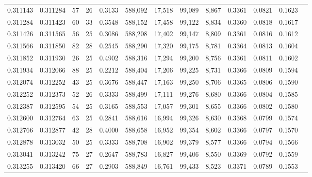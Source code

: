 \begin{tabular}{rrrrrrrrrrrrr}
0.311143 & 0.311284 &  57 &  26 &                                     0.3133 & 588,092 &  17,518 &  99,089 &   8,867 & 0.3361 & 0.0821 & 0.1623 \\
0.311284 & 0.311423 &  60 &  33 &                                     0.3548 & 588,152 &  17,458 &  99,122 &   8,834 & 0.3360 & 0.0818 & 0.1617 \\
0.311426 & 0.311565 &  56 &  25 &                                     0.3086 & 588,208 &  17,402 &  99,147 &   8,809 & 0.3361 & 0.0816 & 0.1612 \\
0.311566 & 0.311850 &  82 &  28 &                                     0.2545 & 588,290 &  17,320 &  99,175 &   8,781 & 0.3364 & 0.0813 & 0.1604 \\
0.311852 & 0.311930 &  26 &  25 &                                     0.4902 & 588,316 &  17,294 &  99,200 &   8,756 & 0.3361 & 0.0811 & 0.1602 \\
0.311934 & 0.312066 &  88 &  25 &                                     0.2212 & 588,404 &  17,206 &  99,225 &   8,731 & 0.3366 & 0.0809 & 0.1594 \\
0.312074 & 0.312252 &  43 &  25 &                                     0.3676 & 588,447 &  17,163 &  99,250 &   8,706 & 0.3365 & 0.0806 & 0.1590 \\
0.312252 & 0.312373 &  52 &  26 &                                     0.3333 & 588,499 &  17,111 &  99,276 &   8,680 & 0.3366 & 0.0804 & 0.1585 \\
0.312387 & 0.312595 &  54 &  25 &                                     0.3165 & 588,553 &  17,057 &  99,301 &   8,655 & 0.3366 & 0.0802 & 0.1580 \\
0.312600 & 0.312764 &  63 &  25 &                                     0.2841 & 588,616 &  16,994 &  99,326 &   8,630 & 0.3368 & 0.0799 & 0.1574 \\
0.312766 & 0.312877 &  42 &  28 &                                     0.4000 & 588,658 &  16,952 &  99,354 &   8,602 & 0.3366 & 0.0797 & 0.1570 \\
0.312878 & 0.313032 &  50 &  25 &                                     0.3333 & 588,708 &  16,902 &  99,379 &   8,577 & 0.3366 & 0.0794 & 0.1566 \\
0.313041 & 0.313242 &  75 &  27 &                                     0.2647 & 588,783 &  16,827 &  99,406 &   8,550 & 0.3369 & 0.0792 & 0.1559 \\
0.313255 & 0.313420 &  66 &  27 &                                     0.2903 & 588,849 &  16,761 &  99,433 &   8,523 & 0.3371 & 0.0789 & 0.1553 \\

\end{tabular}
